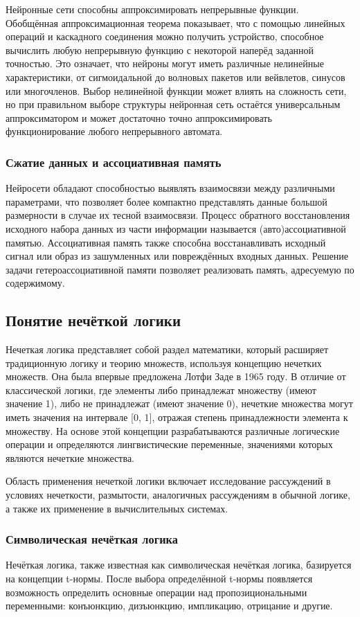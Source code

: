 Нейронные сети способны аппроксимировать непрерывные функции. Обобщённая аппроксимационная теорема показывает, что с помощью линейных операций и каскадного соединения можно получить устройство, способное вычислить любую непрерывную функцию с некоторой наперёд заданной точностью. Это означает, что нейроны могут иметь различные нелинейные характеристики, от сигмоидальной до волновых пакетов или вейвлетов, синусов или многочленов. Выбор нелинейной функции может влиять на сложность сети, но при правильном выборе структуры нейронная сеть остаётся универсальным аппроксиматором и может достаточно точно аппроксимировать функционирование любого непрерывного автомата.

\subsubsection{Сжатие данных и ассоциативная память}
Нейросети обладают способностью выявлять взаимосвязи между различными параметрами, что позволяет более компактно представлять данные большой размерности в случае их тесной взаимосвязи. Процесс обратного восстановления исходного набора данных из части информации называется (авто)ассоциативной памятью. Ассоциативная память также способна восстанавливать исходный сигнал или образ из зашумленных или повреждённых входных данных. Решение задачи гетероассоциативной памяти позволяет реализовать память, адресуемую по содержимому.

\subsection{Понятие нечёткой логики}
Нечеткая логика представляет собой раздел математики, который расширяет традиционную логику и теорию множеств, используя концепцию нечетких множеств. Она была впервые предложена Лотфи Заде в 1965 году. В отличие от классической логики, где элементы либо принадлежат множеству (имеют значение 1), либо не принадлежат (имеют значение 0), нечеткие множества могут иметь значения на интервале [0, 1], отражая степень принадлежности элемента к множеству. На основе этой концепции разрабатываются различные логические операции и определяются лингвистические переменные, значениями которых являются нечеткие множества.

Область применения нечеткой логики включает исследование рассуждений в условиях нечеткости, размытости, аналогичных рассуждениям в обычной логике, а также их применение в вычислительных системах.

\subsubsection{Символическая нечёткая логика}
Нечёткая логика, также известная как символическая нечёткая логика, базируется на концепции t-нормы. После выбора определённой t-нормы появляется возможность определить основные операции над пропозициональными переменными: конъюнкцию, дизъюнкцию, импликацию, отрицание и другие.

